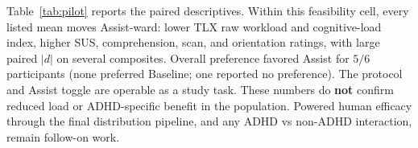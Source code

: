 Table~\ref{tab:pilot} reports the paired descriptives. Within this
feasibility cell, every listed mean moves Assist-ward: lower TLX raw workload
and cognitive-load index, higher SUS, comprehension, scan, and orientation
ratings, with large paired $|d|$ on several composites. Overall preference
favored Assist for $5/6$ participants (none preferred Baseline; one reported
no preference). The protocol and Assist toggle are operable as a study task.
These numbers do \textbf{not} confirm reduced load or ADHD-specific benefit in
the population. Powered human efficacy through the final distribution pipeline,
and any ADHD vs non-ADHD interaction, remain follow-on work.
